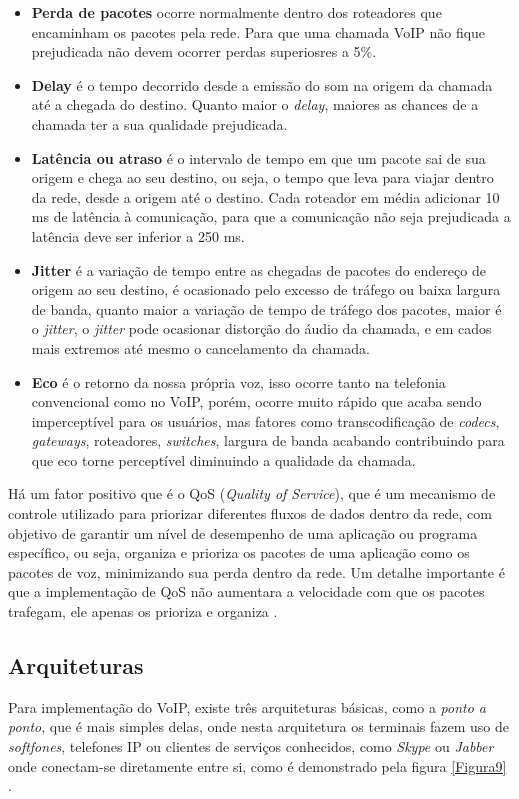 \begin{itemize}
  \item \textbf{Perda de pacotes} ocorre normalmente dentro dos roteadores que encaminham os pacotes pela rede. Para que uma chamada VoIP não fique prejudicada não devem ocorrer perdas superiosres a 5\%.
  \item \textbf{Delay} é o tempo decorrido desde a emissão do som na origem da chamada até a chegada do destino. Quanto maior o \textit{delay}, maiores as chances de a chamada ter a sua qualidade prejudicada.
  \item \textbf{Latência ou atraso} é o intervalo de tempo em que um pacote sai de sua origem e chega ao seu destino, ou seja, o tempo que leva para viajar dentro da rede, desde a origem até o destino. Cada roteador em média adicionar 10 ms de latência à comunicação, para que a comunicação não seja prejudicada a latência deve ser inferior a 250 ms.
  \item \textbf{Jitter} é a variação de tempo entre as chegadas de pacotes do endereço de origem ao seu destino, é ocasionado pelo excesso de tráfego ou baixa largura de banda, quanto maior a variação de tempo de tráfego dos pacotes, maior é o \textit{jitter}, o \textit{jitter} pode ocasionar distorção do áudio da chamada, e em cados mais extremos até mesmo o cancelamento da chamada.
  \item \textbf{Eco} é o retorno da nossa própria voz, isso ocorre tanto na telefonia convencional como no VoIP, porém, ocorre muito rápido que acaba sendo imperceptível para os usuários, mas fatores como transcodificação de \textit{codecs}, \textit{gateways}, roteadores, \textit{switches}, largura de banda acabando contribuindo para que eco torne perceptível diminuindo a qualidade da chamada.
\end{itemize}

Há um fator positivo que é o QoS (\textit{Quality of Service}), que é um mecanismo de controle utilizado para priorizar diferentes fluxos de dados dentro da rede, com objetivo de garantir um nível de desempenho de uma aplicação ou programa específico, ou seja, organiza e prioriza os pacotes de uma aplicação como os pacotes de voz, minimizando sua perda dentro da rede. Um detalhe importante é que a implementação de QoS não aumentara a velocidade com que os pacotes trafegam, ele apenas os prioriza e organiza \cite{thiagowinkler2007}.

\subsection{Arquiteturas}
Para implementação do VoIP, existe três arquiteturas básicas, como a \textit{ponto a ponto}, que é mais simples delas, onde nesta arquitetura os terminais fazem uso de \textit{softfones}, telefones IP ou clientes de serviços conhecidos, como \textit{Skype} ou \textit{Jabber} onde conectam-se diretamente entre si, como é demonstrado pela figura \ref{Figura9} \cite{thiagowinkler2007}.

